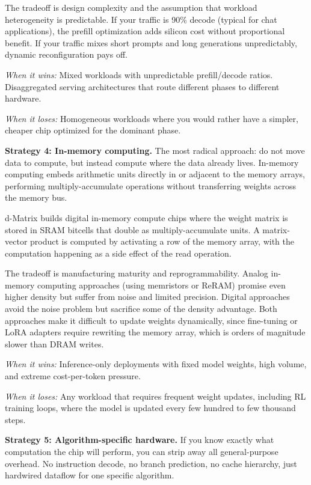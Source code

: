 The tradeoff is design complexity and the assumption that workload heterogeneity is predictable. If your traffic is 90\% decode (typical for chat applications), the prefill optimization adds silicon cost without proportional benefit. If your traffic mixes short prompts and long generations unpredictably, dynamic reconfiguration pays off.

\textit{When it wins:} Mixed workloads with unpredictable prefill/decode ratios. Disaggregated serving architectures that route different phases to different hardware.

\textit{When it loses:} Homogeneous workloads where you would rather have a simpler, cheaper chip optimized for the dominant phase.

\textbf{Strategy 4: In-memory computing.} The most radical approach: do not move data to compute, but instead compute where the data already lives. In-memory computing embeds arithmetic units directly in or adjacent to the memory arrays, performing multiply-accumulate operations without transferring weights across the memory bus.

d-Matrix builds digital in-memory compute chips where the weight matrix is stored in SRAM bitcells that double as multiply-accumulate units. A matrix-vector product is computed by activating a row of the memory array, with the computation happening as a side effect of the read operation.

The tradeoff is manufacturing maturity and reprogrammability. Analog in-memory computing approaches (using memristors or ReRAM) promise even higher density but suffer from noise and limited precision. Digital approaches avoid the noise problem but sacrifice some of the density advantage. Both approaches make it difficult to update weights dynamically, since fine-tuning or LoRA adapters require rewriting the memory array, which is orders of magnitude slower than DRAM writes.

\textit{When it wins:} Inference-only deployments with fixed model weights, high volume, and extreme cost-per-token pressure.

\textit{When it loses:} Any workload that requires frequent weight updates, including RL training loops, where the model is updated every few hundred to few thousand steps.

\textbf{Strategy 5: Algorithm-specific hardware.} If you know exactly what computation the chip will perform, you can strip away all general-purpose overhead. No instruction decode, no branch prediction, no cache hierarchy, just hardwired dataflow for one specific algorithm.

